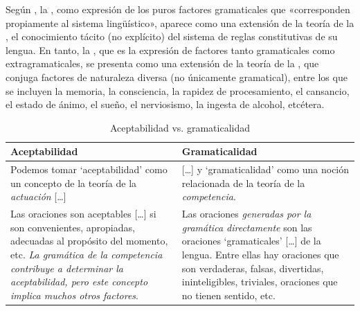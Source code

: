 Según \textcite[32]{bosque2009}, la , como expresión de
los puros factores gramaticales que «corresponden propiamente al sistema
lingüístico», aparece como una extensión de la teoría de la
, el conocimiento tácito (no explícito) del sistema de
reglas constitutivas de su lengua. En tanto, la , que es
la expresión de factores tanto gramaticales como extragramaticales, se presenta
como una extensión de la teoría de la , que conjuga factores
de naturaleza diversa (no únicamente gramatical), entre los que se incluyen la
memoria, la consciencia, la rapidez de procesamiento, el cansancio, el estado
de ánimo, el sueño, el nerviosismo, la ingesta de alcohol, etcétera.

\begin{table}[htbp]
  \centering
  \begin{tabularx}{\linewidth}{@{}L L@{}}
    \toprule
    \textbf{Aceptabilidad} & \textbf{Gramaticalidad} \\
    \midrule
    Podemos tomar \enquote*{aceptabilidad} como un concepto de la teoría de la
    \textit{actuación} [\ldots]
      & [\ldots] y \enquote*{gramaticalidad} como una noción relacionada de la
        teoría de la \textit{competencia}. \\
    \addlinespace
    Las oraciones son aceptables [\ldots] si son convenientes, apropiadas,
    adecuadas al propósito del momento, etc. \textit{La gramática de la
    competencia contribuye a determinar la aceptabilidad, pero este concepto
    implica muchos otros factores}.
      & Las oraciones \textit{generadas por la gramática directamente} son las
        oraciones \enquote*{gramaticales} [\ldots] de la lengua. Entre ellas hay
        oraciones que son verdaderas, falsas, divertidas, ininteligibles,
        triviales, oraciones que no tienen sentido, etc. \\
    \bottomrule
  \end{tabularx}
  \caption{Aceptabilidad vs. gramaticalidad}\label{tab:02-aceptabilidad}
\end{table}


